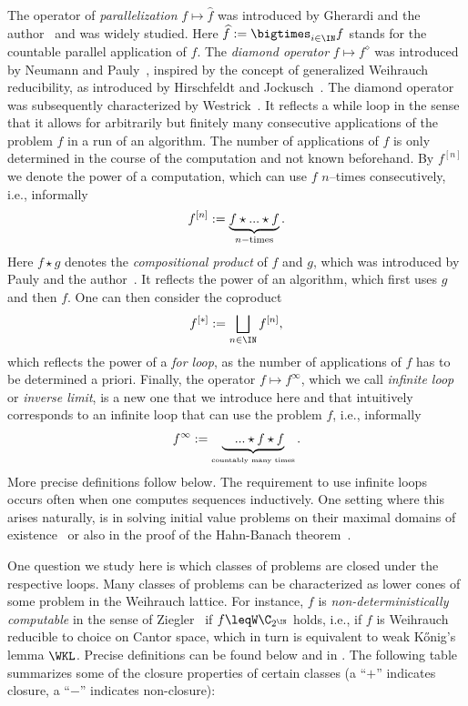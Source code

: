 \noindent
The operator of {\em parallelization} $f\mapsto\widehat{f}$ was introduced by Gherardi and the author~\cite{BG11} and was widely studied.
Here $\widehat{f}:=\bigtimes_{i\in\IN}f$ stands for the countable parallel application of $f$.
The {\em diamond operator} $f\mapsto f^\diamond$ was introduced by Neumann and Pauly~\cite{NP18}, inspired by the concept of generalized Weihrauch
reducibility, as introduced by Hirschfeldt and Jockusch~\cite{HJ16}.
The diamond operator was subsequently characterized by Westrick~\cite{Wes21}. It reflects a while loop in the sense that it allows for
arbitrarily but finitely many consecutive applications of the problem $f$ in a run of an algorithm.
The number of applications of $f$ is only determined in the course of the computation and not known beforehand.
By $f^{[n]}$ we denote the power of a computation, which can use $f$ $n$--times consecutively, i.e., informally
\[f^{[n]}:=\underbrace{f\star ...\star f}_{n\rm-times}.\]
Here $f\star g$ denotes the {\em compositional product} of $f$ and $g$, which was introduced by  Pauly and the author~\cite{BP18}.
It reflects the power of an algorithm, which first uses $g$ and then $f$.
One can then consider the coproduct 
\[f^{[*]}:=\bigsqcup_{n\in\IN}f^{[n]},\] 
which reflects the power of a {\em for loop}, as the number of applications of $f$
has to be determined a priori.
Finally, the operator $f\mapsto f^\infty$, which we call {\em infinite loop} or {\em inverse limit}, is a new one that we introduce here and 
that intuitively corresponds to an infinite loop that can use the problem $f$, i.e., informally
\[f^\infty:=\underbrace{\quad...\star f \star f}_{\mbox{\tiny countably many times}}.\]
More precise definitions follow below.
The requirement to use infinite loops occurs often when one computes sequences inductively. 
One setting where this arises naturally, is in solving initial value problems on their maximal domains of existence~\cite{BS25} or also in the proof of the Hahn-Banach theorem~\cite{BS26}.

One question we study here is which classes of problems are closed under the respective loops.
Many classes of problems can be characterized as lower cones of some problem in the Weihrauch lattice.
For instance, $f$ is {\em non-deterministically computable} in the sense of Ziegler~\cite{Zie07} if $f\leqW\C_{2^\IN}$ holds, i.e.,
if $f$ is Weihrauch reducible to choice on Cantor space, which in turn is equivalent to weak K\H{o}nig's lemma $\WKL$.
Precise definitions can be found below and in \cite{BGP21}.
The following table summarizes some of the closure properties of certain classes (a ``$+$'' indicates closure, a ``$-$'' indicates non-closure):

